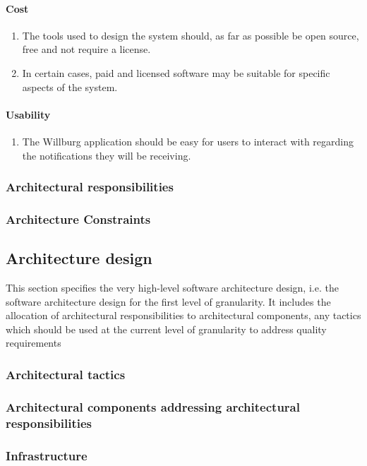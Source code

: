 \documentclass[a4paper,12pt]{report}
\begin{document}
\paragraph{Cost}
\begin{enumerate}
	\item The tools used to design the system should, as far as possible be open source, free and not require a license.
	\item In certain cases, paid and licensed software may be suitable for specific aspects of the system. 
\end{enumerate}
\paragraph{Usability}
\begin{enumerate}
	\item The Willburg application should be easy for users to interact with regarding the notifications they will be receiving.
\end{enumerate}
\newpage

\subsubsection {Architectural responsibilities}
\subsubsection {Architecture Constraints}

\subsection {Architecture design}
This section specifies the very high-level software architecture design, i.e. the software architecture
design for the first level of granularity. It includes the allocation of architectural responsibilities to
architectural components, any tactics which should be used at the current level of granularity to
address quality requirements

\subsubsection {Architectural tactics}
\subsubsection {Architectural components addressing architectural responsibilities}
\subsubsection {Infrastructure}
\end{document}
